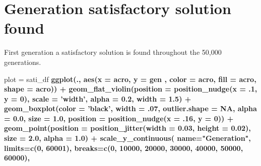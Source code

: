 \documentclass[]{book}
\newenvironment{Shaded}{\begin{snugshade}}{\end{snugshade}}
\newcommand{\DataTypeTok}[1]{\textcolor[rgb]{0.13,0.29,0.53}{#1}}
\newcommand{\DecValTok}[1]{\textcolor[rgb]{0.00,0.00,0.81}{#1}}
\newcommand{\FloatTok}[1]{\textcolor[rgb]{0.00,0.00,0.81}{#1}}
\newcommand{\KeywordTok}[1]{\textcolor[rgb]{0.13,0.29,0.53}{\textbf{#1}}}
\newcommand{\NormalTok}[1]{#1}
\newcommand{\OperatorTok}[1]{\textcolor[rgb]{0.81,0.36,0.00}{\textbf{#1}}}
\newcommand{\OtherTok}[1]{\textcolor[rgb]{0.56,0.35,0.01}{#1}}
\newcommand{\StringTok}[1]{\textcolor[rgb]{0.31,0.60,0.02}{#1}}
\begin{document}
\hypertarget{generation-satisfactory-solution-found-1}{%
\section{Generation satisfactory solution found}\label{generation-satisfactory-solution-found-1}}

First generation a satisfactory solution is found throughout the 50,000 generations.

\begin{Shaded}
\begin{Highlighting}[]
\NormalTok{plot =}\StringTok{ }\NormalTok{sati_df }\OperatorTok{%>%}
\StringTok{  }\KeywordTok{ggplot}\NormalTok{(., }\KeywordTok{aes}\NormalTok{(}\DataTypeTok{x =}\NormalTok{ acro, }\DataTypeTok{y =}\NormalTok{ gen , }\DataTypeTok{color =}\NormalTok{ acro, }\DataTypeTok{fill =}\NormalTok{ acro, }\DataTypeTok{shape =}\NormalTok{ acro)) }\OperatorTok{+}
\StringTok{  }\KeywordTok{geom_flat_violin}\NormalTok{(}\DataTypeTok{position =} \KeywordTok{position_nudge}\NormalTok{(}\DataTypeTok{x =} \FloatTok{.1}\NormalTok{, }\DataTypeTok{y =} \DecValTok{0}\NormalTok{), }\DataTypeTok{scale =} \StringTok{'width'}\NormalTok{, }\DataTypeTok{alpha =} \FloatTok{0.2}\NormalTok{, }\DataTypeTok{width =} \FloatTok{1.5}\NormalTok{) }\OperatorTok{+}
\StringTok{  }\KeywordTok{geom_boxplot}\NormalTok{(}\DataTypeTok{color =} \StringTok{'black'}\NormalTok{, }\DataTypeTok{width =} \FloatTok{.07}\NormalTok{, }\DataTypeTok{outlier.shape =} \OtherTok{NA}\NormalTok{, }\DataTypeTok{alpha =} \FloatTok{0.0}\NormalTok{, }\DataTypeTok{size =} \FloatTok{1.0}\NormalTok{, }\DataTypeTok{position =} \KeywordTok{position_nudge}\NormalTok{(}\DataTypeTok{x =} \FloatTok{.16}\NormalTok{, }\DataTypeTok{y =} \DecValTok{0}\NormalTok{)) }\OperatorTok{+}
\StringTok{  }\KeywordTok{geom_point}\NormalTok{(}\DataTypeTok{position =} \KeywordTok{position_jitter}\NormalTok{(}\DataTypeTok{width =} \FloatTok{0.03}\NormalTok{, }\DataTypeTok{height =} \FloatTok{0.02}\NormalTok{), }\DataTypeTok{size =} \FloatTok{2.0}\NormalTok{, }\DataTypeTok{alpha =} \FloatTok{1.0}\NormalTok{) }\OperatorTok{+}
\StringTok{  }\KeywordTok{scale_y_continuous}\NormalTok{(}
    \DataTypeTok{name=}\StringTok{"Generation"}\NormalTok{,}
    \DataTypeTok{limits=}\KeywordTok{c}\NormalTok{(}\DecValTok{0}\NormalTok{, }\DecValTok{60001}\NormalTok{),}
    \DataTypeTok{breaks=}\KeywordTok{c}\NormalTok{(}\DecValTok{0}\NormalTok{, }\DecValTok{10000}\NormalTok{, }\DecValTok{20000}\NormalTok{, }\DecValTok{30000}\NormalTok{, }\DecValTok{40000}\NormalTok{, }\DecValTok{50000}\NormalTok{, }\DecValTok{60000}\NormalTok{),}
}
\end{Highlighting}
\end{Shaded}
\end{document}
